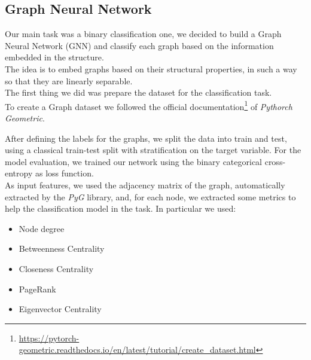\subsection{Graph Neural Network}

Our main task was a binary classification one, we decided to build a Graph Neural Network (GNN) and classify each graph based on the information embedded in the structure.\\
The idea is to embed graphs based on their structural properties, in such a way so that they are linearly separable.\\

The first thing we did was prepare the dataset for the classification task.\\
To create a Graph dataset we followed the official documentation\footnote{\url{https://pytorch-geometric.readthedocs.io/en/latest/tutorial/create_dataset.html}} of \textit{Pythorch Geometric}.

After defining the labels for the graphs, we split the data into train and test, using a classical train-test split with stratification on the target variable. For the model evaluation, we trained our network using the binary categorical cross-entropy as loss function.\\
As input features, we used the adjacency matrix of the graph, automatically extracted by the \textit{PyG} library, and, for each node, we extracted some metrics to help the classification model in the task. In particular we used:
\begin{itemize}
    \item Node degree 
    \item Betweenness Centrality
    \item Closeness Centrality
    \item PageRank
    \item Eigenvector Centrality
\end{itemize}


